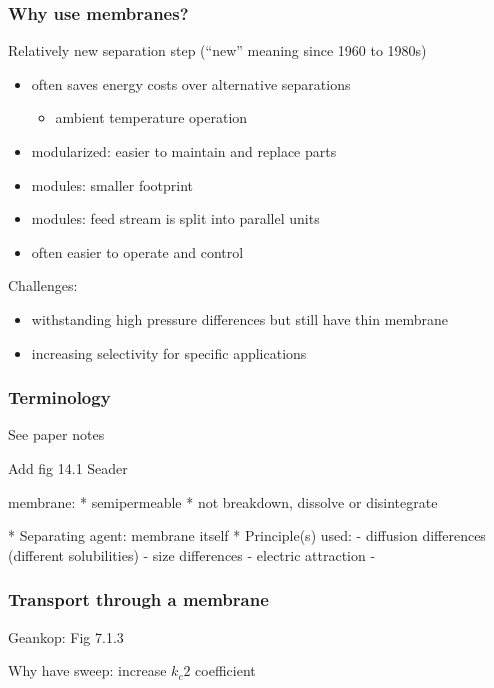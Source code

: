 \begin{frame}\frametitle{Why use membranes?}
	Relatively new separation step (``new'' meaning since 1960 to 1980s)
	\begin{itemize}
		\item	often saves energy costs over alternative separations
		\begin{itemize}
			\item	ambient temperature operation
		\end{itemize}
		\item	modularized: easier to maintain and replace parts
		\item	modules: smaller footprint
		\item	modules: feed stream is split into parallel units
		\item	often easier to operate and control
	\end{itemize}
	Challenges:
	\begin{itemize}
		\item	withstanding high pressure differences but still have thin membrane
		\item	increasing selectivity for specific applications
	\end{itemize}
\end{frame}

\begin{frame}\frametitle{Terminology}
	See paper notes
	
	Add fig 14.1 Seader
	
	membrane: 
	* semipermeable
	* not breakdown, dissolve or disintegrate
	
	* Separating agent: membrane itself
	* Principle(s) used:
	 - diffusion differences (different solubilities)
	 - size differences
	 - electric attraction
	 - 
	
\end{frame}

\begin{frame}\frametitle{Transport through a membrane}
	Geankop: Fig 7.1.3 
	
	Why have sweep: increase $k_c2$ coefficient
\end{frame}



